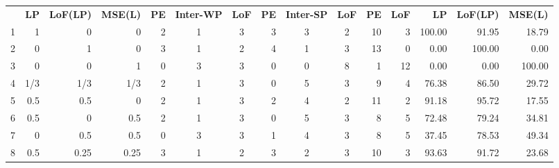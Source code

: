 \begin{table}[h]
{\begin{tabular}{rrrrccccccrrrrr}
  & \textbf{LP} & \textbf{LoF(LP)} & \textbf{MSE(L)} & \textbf{PE} & \textbf{Inter-WP} & \textbf{LoF} & \textbf{PE} & \textbf{Inter-SP} & \textbf{LoF}& \textbf{PE}      & \textbf{LoF}      & \textbf{LP} & \textbf{LoF(LP)} & \textbf{MSE(L)} \\
1 & 1    & 0    & 0    & \multicolumn{1}{|r}{2} & 1 & 3 & \multicolumn{1}{|r}{3} & 3 & 2 & \multicolumn{1}{|r}{10} & 3  & \multicolumn{1}{|r}{100.00} & 91.95  & 18.79  \\
2 & 0    & 1    & 0    & \multicolumn{1}{|r}{3} & 1 & 2 & \multicolumn{1}{|r}{4} & 1 & 3 & \multicolumn{1}{|r}{13} & 0  & \multicolumn{1}{|r}{0.00}   & 100.00 & 0.00   \\
3 & 0    & 0    & 1    & \multicolumn{1}{|r}{0} & 3 & 3 & \multicolumn{1}{|r}{0} & 0 & 8 & \multicolumn{1}{|r}{1}  & 12 & \multicolumn{1}{|r}{0.00}   & 0.00   & 100.00 \\
4 & 1/3 & 1/3 & 1/3    & \multicolumn{1}{|r}{2} & 1 & 3 & \multicolumn{1}{|r}{0} & 5 & 3 & \multicolumn{1}{|r}{9}  & 4  & \multicolumn{1}{|r}{76.38}  & 86.50  & 29.72  \\
5 & 0.5  & 0.5  & 0    & \multicolumn{1}{|r}{2} & 1 & 3 & \multicolumn{1}{|r}{2} & 4 & 2 & \multicolumn{1}{|r}{11} & 2  & \multicolumn{1}{|r}{91.18}  & 95.72  & 17.55  \\
6 & 0.5  & 0    & 0.5  & \multicolumn{1}{|r}{2} & 1 & 3 & \multicolumn{1}{|r}{0} & 5 & 3 & \multicolumn{1}{|r}{8}  & 5  & \multicolumn{1}{|r}{72.48}  & 79.24  & 34.81  \\
7 & 0    & 0.5  & 0.5  & \multicolumn{1}{|r}{0} & 3 & 3 & \multicolumn{1}{|r}{1} & 4 & 3 & \multicolumn{1}{|r}{8}  & 5  & \multicolumn{1}{|r}{37.45}  & 78.53  & 49.34  \\
8 & 0.5  & 0.25 & 0.25 & \multicolumn{1}{|r}{3} & 1 & 2 & \multicolumn{1}{|r}{3} & 2 & 3 & \multicolumn{1}{|r}{10} & 3  & \multicolumn{1}{|r}{93.63}  & 91.72  & 23.68 
\end{tabular}
}
\end{table}    

